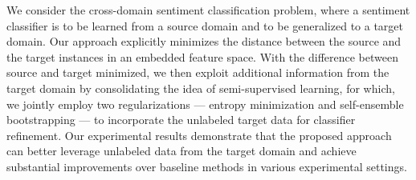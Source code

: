 We consider the cross-domain sentiment classification problem, where a sentiment classifier is to be learned from a source domain and to be generalized to a target domain. Our approach explicitly minimizes the distance between the source and the target instances in an embedded feature space. With the difference between source and target minimized, we then exploit additional information from the target domain by consolidating the idea of semi-supervised learning, for which, we jointly employ two regularizations --- entropy minimization and self-ensemble bootstrapping --- to incorporate the unlabeled target data for classifier refinement. Our experimental results demonstrate that the proposed approach can better leverage unlabeled data from the target domain and achieve substantial improvements over baseline methods in various experimental settings.
